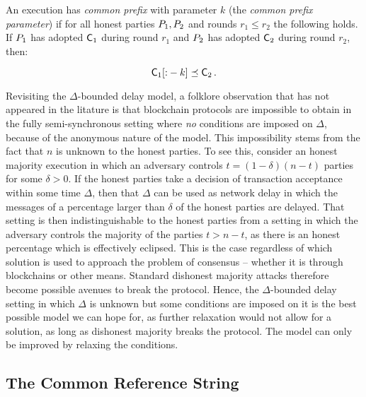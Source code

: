 \begin{definition}
  An execution has \emph{common prefix} with parameter $k$ (the \emph{common
  prefix parameter}) if for all honest parties $P_1, P_2$ and rounds
  $r_1 \leq r_2$ the following holds. If $P_1$ has adopted $\mathsf{C}_1$
  during round $r_1$ and $P_2$ has adopted $\mathsf{C}_2$ during round $r_2$,
  then:

  \[
  \mathsf{C}_1[{:}-k] \preceq \mathsf{C}_2
  \,.
  \]
\end{definition}

\begin{remark}
Revisiting the $\Delta$-bounded delay model, a folklore observation that has not appeared in
the litature is that blockchain protocols are impossible to obtain in the fully
semi-synchronous setting where \emph{no} conditions are imposed on $\Delta$,
because of the anonymous nature of the model. This impossibility stems from the
fact that $n$ is unknown to the honest parties. To see this, consider an
honest majority execution in which an adversary controls $t = (1 - \delta)(n -
t)$ parties for some $\delta > 0$. If the honest parties take a decision of
transaction acceptance within some time $\Delta$, then that $\Delta$ can be used
as network delay in which the messages of a percentage larger than $\delta$ of
the honest parties are delayed. That setting is then indistinguishable to the
honest parties from a setting in which the adversary controls the majority of
the parties $t > n - t$, as there is an honest percentage which is effectively
eclipsed. This is the case regardless of which solution is used to approach the
problem of consensus -- whether it is through blockchains or other means.
Standard dishonest majority attacks therefore become possible avenues to break
the protocol. Hence, the $\Delta$-bounded delay setting in which $\Delta$ is
unknown but some conditions are imposed on it is the best possible model we can
hope for, as further relaxation would not allow for a solution, as long as
dishonest majority breaks the protocol. The model can only be improved by
relaxing the conditions.
\end{remark}


\subsection{The Common Reference String}


